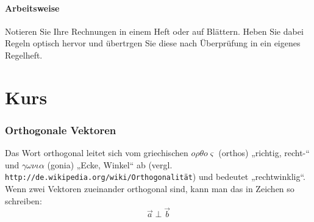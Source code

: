 \documentclass[12pt,a4paper,twoside,fleqn]{article}
\begin{document}
\subsection*{Arbeitsweise}
Notieren Sie Ihre Rechnungen in einem Heft oder auf Blättern. Heben
Sie dabei Regeln optisch hervor und übertrgen Sie diese nach
Überprüfung in ein eigenes Regelheft.
\tableofcontents
\part{Kurs}
\section{Orthogonale Vektoren}
Das Wort orthogonal leitet sich vom griechischen
$o\rho\theta o\varsigma$  (orthos)
„richtig, recht-“ und $\gamma\omega\nu\iota\alpha$ (gonia) „Ecke, Winkel“ ab
(vergl. \texttt{http://de.wikipedia.org/wiki/Orthogonalität}) und
bedeutet „rechtwinklig“. Wenn zwei Vektoren zueinander orthogonal
sind, kann man das in Zeichen so schreiben: $$\vec{a}\perp\vec{b}$$
\end{document}
